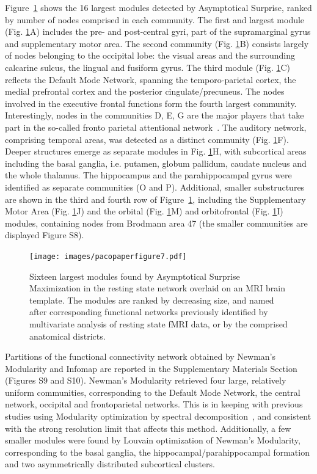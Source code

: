 Figure~\ref{fig:cervellini4x4} shows the 16 largest modules detected by Asymptotical Surprise, ranked by number of nodes comprised in each community. 
The first and largest module (Fig. \ref{fig:cervellini4x4}A) includes the pre- and post-central gyri, part of the supramarginal gyrus and supplementary motor area.
The second community (Fig. \ref{fig:cervellini4x4}B) consists largely of nodes belonging to the occipital lobe: the visual areas and the surrounding calcarine sulcus, the lingual and fusiform gyrus.
The third module (Fig. \ref{fig:cervellini4x4}C) reflects the Default Mode Network, spanning the temporo-parietal cortex, the medial prefrontal cortex and the posterior cingulate/precuneus.
The nodes involved in the executive frontal functions form the fourth largest community.
Interestingly, nodes in the communities D, E, G are the major players that take part in the so-called fronto parietal attentional network~\cite{markett2014}.
The auditory network, comprising temporal areas, was detected as a distinct community (Fig. \ref{fig:cervellini4x4}F).
Deeper structures emerge as separate modules in Fig. \ref{fig:cervellini4x4}H, with subcortical areas including the basal ganglia, i.e. putamen, globum pallidum, caudate nucleus and the whole thalamus.
The hippocampus and the parahippocampal gyrus were identified as separate communities (O and P).
Additional, smaller substructures are shown in the third and fourth row of Figure~\ref{fig:cervellini4x4}, including the Supplementary Motor Area (Fig. \ref{fig:cervellini4x4}J) and the orbital (Fig. \ref{fig:cervellini4x4}M) and orbitofrontal (Fig. \ref{fig:cervellini4x4}I) modules, containing nodes from Brodmann area 47 (the smaller communities are displayed Figure S8).

\begin{figure}[htb!]
\texttt{[image: images/pacopaperfigure7.pdf]}
\caption{Sixteen largest modules found by Asymptotical Surprise Maximization in the resting state network overlaid on an MRI brain template. The modules are ranked by decreasing size, and named after corresponding functional networks previously identified by multivariate analysis of resting state fMRI data, or by the comprised anatomical districts.}
\label{fig:cervellini4x4}
\end{figure}

Partitions of the functional connectivity network obtained by Newman's Modularity and Infomap are reported in the Supplementary Materials Section (Figures S9 and S10).
Newman's Modularity retrieved four large, relatively uniform communities, corresponding to the Default Mode Network, the central network, occipital and frontoparietal networks.
This is in keeping with previous studies using Modularity optimization by spectral decomposition~\cite{crossley2013a}, and consistent with the strong resolution limit that affects this method.
Additionally, a few smaller modules were found by Louvain optimization of Newman's Modularity, corresponding to the basal ganglia, the hippocampal/parahippocampal formation and two asymmetrically distributed subcortical clusters.

